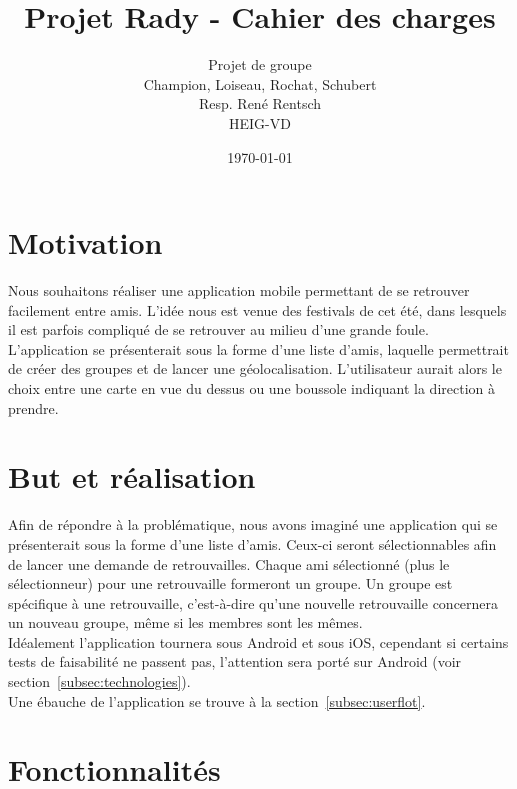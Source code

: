 \documentclass[french]{article}
\begin{document}
	
	\title{Projet Rady - Cahier des charges}
	\author{Projet de groupe\\
		Champion, Loiseau, Rochat, Schubert\\
		Resp. René Rentsch\\
		HEIG-VD}
	\date{\today}
	\maketitle
	
	\tableofcontents
	
	\justify
	
	\section{Motivation}
		 Nous souhaitons réaliser une application mobile permettant de se retrouver facilement entre amis. L’idée nous est venue des festivals de cet été, dans lesquels il est parfois compliqué de se retrouver au milieu d’une grande foule. L’application se présenterait sous la forme d’une liste d’amis, laquelle permettrait de créer des groupes et de lancer une géolocalisation. L’utilisateur aurait alors le choix entre une carte en vue du dessus ou une boussole indiquant la direction à
		 prendre.
	
	\section{But et réalisation}
		Afin de répondre à la problématique, nous avons imaginé une application qui se présenterait sous la forme d'une liste d'amis. Ceux-ci seront sélectionnables afin de lancer une demande de retrouvailles. Chaque ami sélectionné (plus le sélectionneur) pour une retrouvaille formeront un groupe. Un groupe est spécifique à une retrouvaille, c'est-à-dire qu'une nouvelle retrouvaille concernera un nouveau groupe, même si les membres sont les mêmes.\\
		
		Idéalement l'application tournera sous Android et sous iOS, cependant si certains tests de faisabilité ne passent pas, l'attention sera porté sur Android (voir section~\ref{subsec:technologies}).\\
		
		Une ébauche de l'application se trouve à la section~\ref{subsec:userflot}.
	
	\section{Fonctionnalités}
\end{document}
